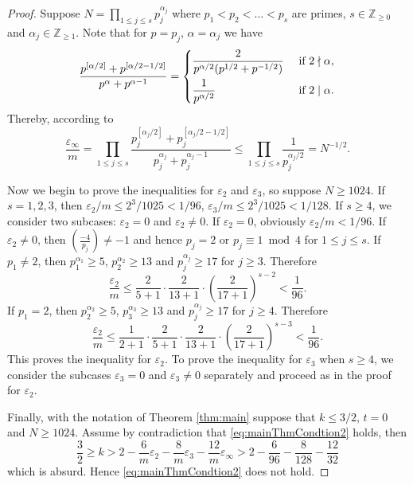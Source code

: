 \documentclass[12pt]{amsart}
\numberwithin{equation}{section}
\theoremstyle{plain}
\theoremstyle{definition}
\theoremstyle{remark}
\newcommand\legendre[2]{\genfrac{(}{)}{}{}{#1}{#2}}
\newcommand\numgeq[2]{\mathbb{#1}_{\geq #2}}
\begin{document}
\begin{proof}
Suppose $N=\prod_{1\leq j\leq s}p_j^{\alpha_j}$ where $p_1<p_2<\dots<p_s$ are primes, $s\in\numgeq{Z}{0}$ and $\alpha_j\in\numgeq{Z}{1}$. Note that for $p=p_j$, $\alpha=\alpha_j$ we have
\begin{equation*}
\frac{p^{[\alpha/2]}+p^{[\alpha/2-1/2]}}{p^{\alpha}+p^{\alpha-1}}=\begin{dcases}
\frac{2}{p^{\alpha/2}(p^{1/2}+p^{-1/2})} &\text{ if } 2\nmid\alpha,\\
\frac{1}{p^{\alpha/2}} &\text{ if } 2\mid\alpha.
\end{dcases}
\end{equation*}
Thereby, according to \cite[Corollary 6.3.24(b)]{CS17}
\begin{equation}
\label{eq:einftymN}
\frac{\varepsilon_\infty}{m}=\prod_{1\leq j\leq s}\frac{p_j^{[\alpha_j/2]}+p_j^{[\alpha_j/2-1/2]}}{p_j^{\alpha_j}+p_j^{\alpha_j-1}}\leq\prod_{1\leq j \leq s}\frac{1}{p_j^{\alpha_j/2}}=N^{-1/2}.
\end{equation}

Now we begin to prove the inequalities for $\varepsilon_2$ and $\varepsilon_3$, so suppose $N\geq1024$. If $s=1,2,3$, then $\varepsilon_2/m\leq2^3/1025<1/96$, $\varepsilon_3/m\leq2^3/1025<1/128$. If $s\geq4$, we consider two subcases: $\varepsilon_2=0$ and $\varepsilon_2\neq0$. If $\varepsilon_2=0$, obviously $\varepsilon_2/m<1/96$. If $\varepsilon_2\neq0$, then $\legendre{-4}{p_j}\neq-1$ and hence $p_j=2$ or $p_j\equiv1\bmod 4$ for $1\leq j\leq s$. If $p_1\neq2$, then $p_1^{\alpha_1}\geq 5$, $p_2^{\alpha_2}\geq 13$ and $p_j^{\alpha_j}\geq 17$ for $j\geq3$. Therefore
\begin{equation*}
\frac{\varepsilon_2}{m}\leq\frac{2}{5+1}\cdot\frac{2}{13+1}\cdot\left(\frac{2}{17+1}\right)^{s-2}<\frac{1}{96}.
\end{equation*}
If $p_1=2$, then $p_2^{\alpha_2}\geq 5$, $p_3^{\alpha_3}\geq 13$ and $p_j^{\alpha_j}\geq 17$ for $j\geq4$. Therefore
\begin{equation*}
\frac{\varepsilon_2}{m}\leq\frac{1}{2+1}\cdot\frac{2}{5+1}\cdot\frac{2}{13+1}\cdot\left(\frac{2}{17+1}\right)^{s-3}<\frac{1}{96}.
\end{equation*}
This proves the inequality for $\varepsilon_2$. To prove the inequality for $\varepsilon_3$ when $s\geq4$, we consider the subcases $\varepsilon_3=0$ and $\varepsilon_3\neq0$ separately and proceed as in the proof for $\varepsilon_2$.

Finally, with the notation of Theorem \ref{thm:main} suppose that $k\leq3/2$, $t=0$ and $N\geq1024$. Assume by contradiction that \eqref{eq:mainThmCondtion2} holds, then
\begin{equation*}
\frac{3}{2} \geq k > 2-\frac{6}{m}\varepsilon_2-\frac{8}{m}\varepsilon_3-\frac{12}{m}\varepsilon_\infty>2-\frac{6}{96}-\frac{8}{128}-\frac{12}{32}
\end{equation*}
which is absurd. Hence \eqref{eq:mainThmCondtion2} does not hold.
\end{proof}
\end{document}
